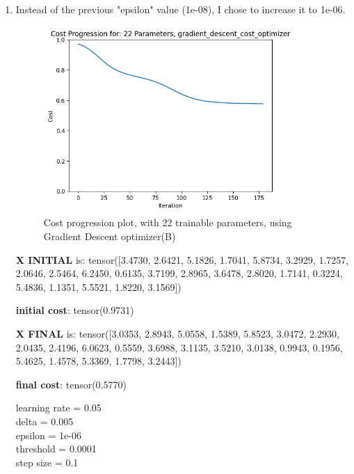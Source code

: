 \documentclass[inscr,ack,preface]{diphdthesis}
\begin{document}
\begin{enumerate}[label=\textbf{\Alph*.}]
    \item \textbf{ }

    Instead of the previous "epsilon" value (1e-08), I chose to increase it to 1e-06.

    \begin{figure}[H]
        \centering
        \includegraphics[width=0.9\textwidth]{epsilon06/22.png}
        \caption{Cost progression plot, with 22 trainable parameters, using Gradient Descent optimizer(B)} 
        \label{fig:fig2}
    \end{figure}

    \textbf{X INITIAL} is:
    tensor([3.4730, 2.6421, 5.1826, 1.7041, 5.8734, 3.2929, 1.7257, 2.0646, 2.5464,
           6.2450, 0.6135, 3.7199, 2.8965, 3.6478, 2.8020, 1.7141, 0.3224, 5.4836,
           1.1351, 5.5521, 1.8220, 3.1569])
           
    \textbf{initial cost}: tensor(0.9731)

    \textbf{X FINAL} is:
    tensor([3.0353, 2.8943, 5.0558, 1.5389, 5.8523, 3.0472, 2.2930, 2.0435, 2.4196,
           6.0623, 0.5559, 3.6988, 3.1135, 3.5210, 3.0138, 0.9943, 0.1956, 5.4625,
           1.4578, 5.3369, 1.7798, 3.2443])

    \textbf{final cost}: tensor(0.5770)

    learning rate =  0.05 \\
    delta =  0.005 \\
    epsilon =  1e-06 \\
    threshold =  0.0001\\ 
    step size =  0.1 \\

\end{enumerate}
\end{document}
